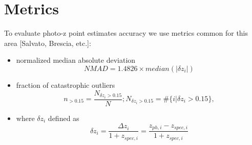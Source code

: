 \section{Metrics}

To evaluate photo-z point estimates accuracy we use metrics common for this area [Salvato, Brescia, etc.]:
\begin{itemize}

    
    \item normalized median absolute deviation
    \begin{equation}\label{eq:nmad}
        NMAD = 1.4826 \times median(|\delta z_i|)
    \end{equation}{}
    
    \item fraction of catastrophic outliers
    \begin{equation}\label{eq:catout_formula}
        n_{>0.15} = \frac{N_{\delta z_i > 0.15}}{N}; N_{\delta z_i > 0.15} = \#\{i | \delta z_i > 0.15\},
    \end{equation}{}
    
    
    \item where \(\delta z_i\) defined as
    \begin{equation}\label{eq:deltaznorm}
    \delta z_i = \frac{\Delta z_i}{1+z_{spec,i}} = \frac{z_{ph,i} - z_{spec,i}}{1+z_{spec,i}}
\end{equation}
    
\end{itemize}        